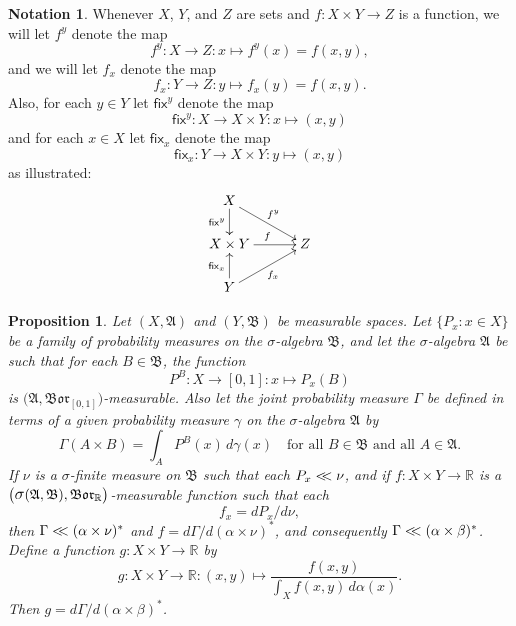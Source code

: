 \documentclass[
twoside=true,
paper=letter,
fontsize=11pt,
pagesize=auto,
leqno,
openany,
headsepline,
overfullrule,
]{scrbook}
\theoremstyle{plain}
\theoremstyle{plain}
\newtheorem{prop}[thm]{Proposition}
\theoremstyle{definition}
\newtheorem{notn}[thm]{Notation}
\theoremstyle{bfnoteitalic}
\theoremstyle{bfnoteroman}
\newcommand{\sigalg}[1]{\mathfrak{#1}}
\newcommand{\sfop}[1]{\mathsf{#1}}
\newcommand{\borel}{\mathfrak{Bor}}
\newcommand{\sagb}{\mathop{\hbox{\large{$\sigma$}}}\nolimits}
\newcommand{\textsigma}{\hbox{\large{$\sigma$}}\kern-1pt}
\newcommand{\R}{\mathbb{R}}
\newcommand{\sigmaalgebra}{\sigalg{A}}
\newcommand{\sigmaalgebraii}{\sigalg{B}}
\newcommand{\productsig}[2]{\sagb(#1,#2)}
\newcommand{\funcf}{f}
\newcommand{\funcg}{g}
\newcommand{\function}{f}
\newcommand{\measurespace}{X}
\newcommand{\measurespaceii}{Y}
\newcommand{\measurespaceiii}{Z}
\newcommand{\mspaceelt}{x}
\newcommand{\mspaceeltii}{y}
\newcommand{\abscont}{\mathrel{< \kern-3.5pt <}}
\newcommand{\measnu}{\nu}
\newcommand{\fixinthefirst}[1]{\sfop{fix}_{#1}}
\newcommand{\fixinthesecond}[1]{\sfop{fix}^{#1}}
\newcommand{\pspace}{\measurespace}%
\newcommand{\sspace}{\measurespaceii}%
\newcommand{\pspaceset}{A}
\newcommand{\sspaceset}{B}
\newcommand{\pspaceelt}{x}
\newcommand{\sspaceelt}{y}
\newcommand{\sspacesig}{\sigalg{B}}
\newcommand{\pspacesig}{\sigalg{A}}
\newcommand{\joint}{\Gamma}%
\newcommand{\measonprod}{\Gamma}%
\newcommand{\marginalone}{\alpha}%
\newcommand{\marginaltwo}{\beta}%
\newcommand{\prior}{\marginalone}
\newcommand{\predictive}{\marginaltwo}
\newcommand{\wouldbeprior}{\gamma}
\begin{document}
\begin{notn}
Whenever $\measurespace$, $\measurespaceii$, and 
$\measurespaceiii$ are sets and 
$\function
:\measurespace\times\measurespaceii\to\measurespaceiii$ is a function, we will let 
$\function^\mspaceeltii$ denote the map
\[
\function^\mspaceeltii
:\measurespace\to\measurespaceiii: 
\mspaceelt \mapsto \function^\mspaceeltii(\mspaceelt) 
= \function(\mspaceelt,\mspaceeltii),
\]
and we will let $\function_\mspaceelt$ denote the map
\[
\function_\mspaceelt
:\measurespaceii\to\measurespaceiii: 
\mspaceeltii \mapsto \function_\mspaceelt(\mspaceeltii) 
= \function(\mspaceelt,\mspaceeltii).
\]
Also, for each $\mspaceeltii\in\measurespaceii$ let
$\fixinthesecond{\mspaceeltii}$ denote the map
\[
\fixinthesecond{\mspaceeltii}
:\measurespace\to\measurespace\times\measurespaceii
:\mspaceelt\mapsto (\mspaceelt,\mspaceeltii)
\]
and for each $\mspaceelt\in\measurespace$ let
$\fixinthefirst{\mspaceelt}$ denote the map
\[
\fixinthefirst{\mspaceelt}
:\measurespaceii\to\measurespace\times\measurespaceii
:\mspaceeltii\mapsto (\mspaceelt,\mspaceeltii)
\]
as illustrated:
\[
\xymatrix@R=18pt@C=30pt{ 
\measurespace \ar[d]_-{\fixinthesecond{\mspaceeltii}}
\ar[dr]^{\function^\mspaceeltii}
\\
\measurespace\times \measurespaceii
\ar[r]^{\function} & \measurespaceiii
\\
\measurespaceii
\ar[ur]_{\function_\mspaceelt}
\ar[u]^{\fixinthefirst{\mspaceelt}} & \\
}
\]
\end{notn}

\begin{prop}
Let
$(\measurespace, \sigmaalgebra)$
and
$(\measurespaceii, \sigmaalgebraii)$
be measurable spaces.
Let
$\{ P_\pspaceelt :\pspaceelt\in\pspace \}$
be a family of probability measures on the \textsigma-algebra
$\sspacesig$,
and let the \textsigma\hyp{}algebra $\pspacesig$ be such that for each
$\sspaceset\in\sspacesig$, the function
\[
P^\sspaceset
:\pspace \to [0,1]
:\pspaceelt \mapsto P_\pspaceelt(\sspaceset)
\]
is $\bigl(\pspacesig,\borel_{[0,1]}\bigr)$\hyp{}measurable.
Also let the joint probability measure $\joint$  be defined in terms of
a given probability measure $\wouldbeprior$ on the \textsigma-algebra
$\pspacesig$ by
\[
\measonprod(\pspaceset\times\sspaceset)
=
\int_\pspaceset P^\sspaceset(\pspaceelt)
\, d\wouldbeprior(\pspaceelt)
\quad
\text{for all $\sspaceset\in\sspacesig$ and all $\pspaceset \in \pspacesig$.}
\]
If $\measnu$ is a \textsigma-finite measure on $\sspacesig$
such that each
$P_\pspaceelt\abscont \measnu$, and if
$\funcf : \pspace\times\sspace\to\R$ is a
$\bigl(\productsig{\pspacesig}{\sspacesig},\borel_\R\bigr)$\hyp{}measurable function
such that each
\[
\function_\pspaceelt
=
d P_\pspaceelt/d\measnu,
\]
then
$\joint \abscont (\prior \times\measnu)^*$
and
$\funcf
=
d\measonprod/d(\prior \times\measnu)^*$,
and consequently
$\measonprod\abscont (\prior\times\predictive)^*$.
Define a function
$\funcg: \pspace\times\sspace\to\R$ by
\[
\funcg
: \pspace\times\sspace \to \R
: (\pspaceelt,\sspaceelt) \mapsto
\frac
{\funcf(\pspaceelt,\sspaceelt)}
{\int_\pspace \function(\pspaceelt,\sspaceelt)\,
d\prior(\pspaceelt)}.
\]
Then
$\funcg
=
d\measonprod/d(\prior\times\predictive)^*$.
\end{prop}
\end{document}
